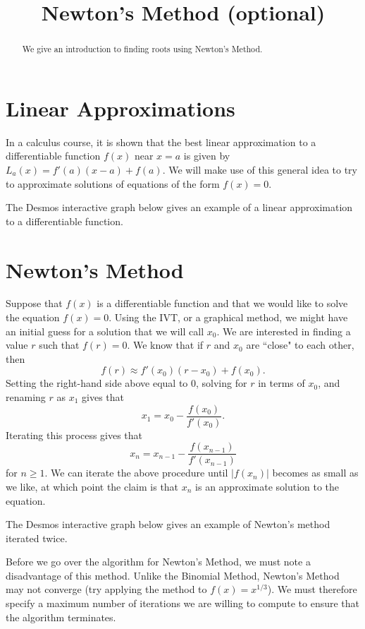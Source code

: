 \documentclass{ximera}
\title{Newton's Method (optional)}
\begin{document}
\begin{abstract}
We give an introduction to finding roots using Newton's Method.
\end{abstract}
\maketitle

\section{Linear Approximations}

In a calculus course, it is shown that the best linear approximation to a differentiable function $f(x)$ near $x=a$ is given by $L_a(x)=f'(a)(x-a)+f(a)$. We will make use of this general idea to try to approximate solutions of equations of the form $f(x)=0$.

The Desmos interactive graph below gives an example of a linear approximation to a differentiable function.


\section{Newton's Method}

Suppose that $f(x)$ is a differentiable function and that we would like to solve the equation $f(x)=0$. Using the IVT, or a graphical method, we might have an initial guess for a solution that we will call $x_0$. We are interested in finding a value $r$ such that $f(r)=0$. We know that if $r$ and $x_0$ are ``close" to each other, then $$f(r)\approx f'(x_0)(r-x_0)+f(x_0).$$ Setting the right-hand side above equal to 0, solving for $r$ in terms of $x_0$, and renaming $r$ as $x_1$ gives that $$x_1=x_0-\frac{f(x_0)}{f'(x_0)}.$$ Iterating this process gives that $$x_n=x_{n-1}-\frac{f(x_{n-1})}{f'(x_{n-1})}$$ for $n\geq 1$. We can iterate the above procedure until $|f(x_n)|$ becomes as small as we like, at which point the claim is that $x_n$ is an approximate solution to the equation.

The Desmos interactive graph below gives an example of Newton's method iterated twice.


Before we go over the algorithm for Newton's Method, we must note a disadvantage of this method. Unlike the Binomial Method, Newton's Method may not converge (try applying the method to $f(x)=x^{1/3}$). We must therefore specify a maximum number of iterations we are willing to compute to ensure that the algorithm terminates.
\end{document}
